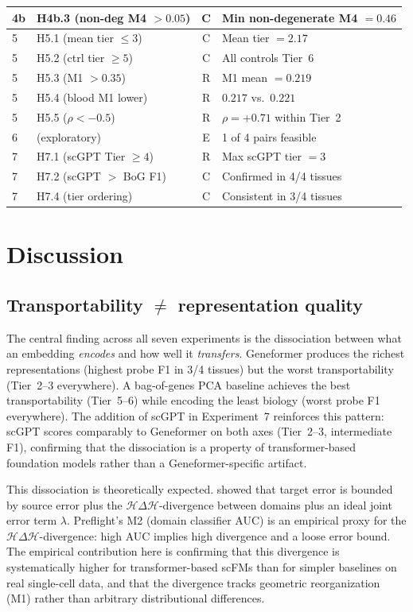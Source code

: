 \documentclass[11pt,letterpaper]{article}
\begin{document}
\begin{table}[t]
\begin{tabular}{@{}llcl@{}}
4b & H4b.3 (non-deg M4 $> 0.05$) & C & Min non-degenerate M4 $= 0.46$ \\
\midrule
5 & H5.1 (mean tier $\leq 3$) & C & Mean tier $= 2.17$ \\
5 & H5.2 (ctrl tier $\geq 5$) & C & All controls Tier~6 \\
5 & H5.3 (M1 $> 0.35$) & R & M1 mean $= 0.219$ \\
5 & H5.4 (blood M1 lower) & R & $0.217$ vs.\ $0.221$ \\
5 & H5.5 ($\rho < -0.5$) & R & $\rho = +0.71$ within Tier~2 \\
\midrule
6 & (exploratory) & E & 1 of 4 pairs feasible \\
\midrule
7 & H7.1 (scGPT Tier $\geq 4$) & R & Max scGPT tier $= 3$ \\
7 & H7.2 (scGPT $>$ BoG F1) & C & Confirmed in 4/4 tissues \\
7 & H7.4 (tier ordering) & C & Consistent in 3/4 tissues \\
\bottomrule
\end{tabular}
\end{table}


\section{Discussion}
\label{sec:discussion}

\subsection{Transportability $\neq$ representation quality}

The central finding across all seven experiments is the dissociation between what an embedding \emph{encodes} and how well it \emph{transfers}. Geneformer produces the richest representations (highest probe F1 in 3/4 tissues) but the worst transportability (Tier~2--3 everywhere). A bag-of-genes PCA baseline achieves the best transportability (Tier~5--6) while encoding the least biology (worst probe F1 everywhere). The addition of scGPT in Experiment~7 reinforces this pattern: scGPT scores comparably to Geneformer on both axes (Tier~2--3, intermediate F1), confirming that the dissociation is a property of transformer-based foundation models rather than a Geneformer-specific artifact.

This dissociation is theoretically expected. \citet{bendavid2010domain} showed that target error is bounded by source error plus the $\mathcal{H}\Delta\mathcal{H}$-divergence between domains plus an ideal joint error term $\lambda$. Preflight's M2 (domain classifier AUC) is an empirical proxy for the $\mathcal{H}\Delta\mathcal{H}$-divergence: high AUC implies high divergence and a loose error bound. The empirical contribution here is confirming that this divergence is systematically higher for transformer-based scFMs than for simpler baselines on real single-cell data, and that the divergence tracks geometric reorganization (M1) rather than arbitrary distributional differences.
\end{document}
